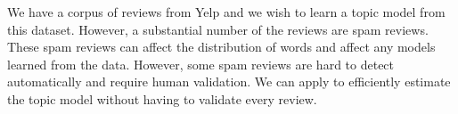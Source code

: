 \begin{example}\sloppy
We have a corpus of reviews from Yelp and we wish to learn a topic model from this dataset.
However, a substantial number of the reviews are spam reviews.
These spam reviews can affect the distribution of words and affect any models learned from the data.
However, some spam reviews are hard to detect automatically and require human validation.
We can apply \sys to efficiently estimate the topic model without having to validate every review.
\end{example}
 










